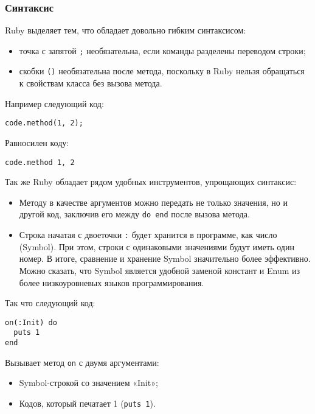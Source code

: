 \documentclass[utf8,a5paper,portrait,12pt]{eskdtext}
\begin{document}
\newpage
\subsubsection{Синтаксис}

Ruby выделяет тем, что обладает довольно гибким синтаксисом:
\begin{itemize}
  \item точка с запятой \texttt{;} необязательна, если команды разделены
        переводом строки;
  \item скобки \texttt{()} необязательна после метода, поскольку в Ruby нельзя
        обращаться к свойствам класса без вызова метода.
\end{itemize}

Например следующий код:

\begin{verbatim}
code.method(1, 2);
\end{verbatim}

Равносилен коду:

\begin{verbatim}
code.method 1, 2
\end{verbatim}

Так же Ruby обладает рядом удобных инструментов, упрощающих синтаксис:
\begin{itemize}
  \item Методу в качестве аргументов можно передать не только значения, но и
        другой код, заключив его между \texttt{do end} после вызова метода.
  \item Строка начатая с двоеточки \texttt{:} будет хранится в программе, как
        число (Symbol). При этом, строки с одинаковыми значениями будут иметь
        один номер. В итоге, сравнение и хранение Symbol значительно более
        эффективно. Можно сказать, что Symbol является удобной заменой констант
        и Enum из более низкоуровневых языков программирования.
\end{itemize}

Так что следующий код:
\begin{verbatim}
on(:Init) do
  puts 1
end
\end{verbatim}

Вызывает метод \texttt{on} с двумя аргументами:
\begin{itemize}
  \item Symbol-строкой со значением «Init»;
  \item Кодов, который печатает 1 (\texttt{puts 1}).
\end{itemize}
\end{document}
